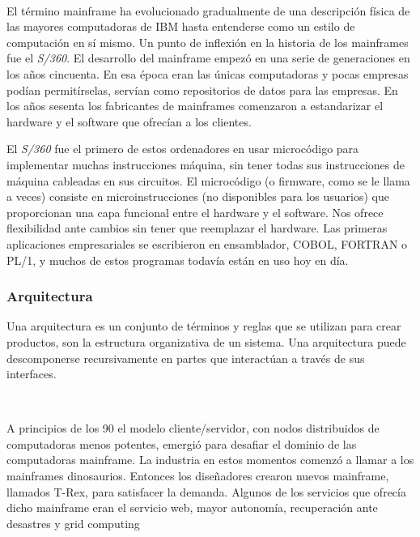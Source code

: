 \documentclass[paper=a4, fontsize=10pt]{scrartcl} %
\numberwithin{equation}{section} %
\numberwithin{figure}{section} %
\numberwithin{table}{section} %
\begin{document}
\

El término mainframe ha evolucionado gradualmente de una descripción física de las mayores computadoras de IBM hasta entenderse como un estilo de computación en sí mismo.
Un punto de inflexión en la historia de los mainframes fue el \textit{S/360}.
El desarrollo del mainframe empezó en una serie de generaciones en los años cincuenta.
En esa época eran las únicas computadoras y pocas empresas podían permitírselas, servían como repositorios de datos para las empresas.
En los años sesenta los fabricantes de mainframes comenzaron a estandarizar el hardware y el software que ofrecían a los clientes.


El \textit{S/360} fue el primero de estos ordenadores en usar microcódigo para implementar muchas instrucciones máquina, sin tener todas sus instrucciones de máquina cableadas en sus circuitos. 
El microcódigo (o firmware, como se le llama a veces) consiste en microinstrucciones (no disponibles para los usuarios) que proporcionan una capa funcional entre el hardware y el software.
Nos ofrece flexibilidad ante cambios sin tener que reemplazar el hardware.
Las primeras aplicaciones empresariales se escribieron en ensamblador, COBOL, FORTRAN o PL/1, y muchos de estos programas todavía están en uso hoy en día.

\subsubsection{Arquitectura}
Una arquitectura es un conjunto de términos y reglas que se utilizan para crear productos, son la estructura organizativa de un sistema.
Una arquitectura puede descomponerse recursivamente en partes que interactúan a través de sus interfaces.

\


A principios de los 90 el modelo cliente/servidor, con nodos distribuidos de computadoras menos potentes, emergió para desafiar el dominio de las computadoras mainframe.
La industria en estos momentos comenzó a llamar a los mainframes dinosaurios.
Entonces los diseñadores crearon nuevos mainframe, llamados T-Rex, para satisfacer la demanda.
Algunos de los servicios que ofrecía dicho mainframe eran el servicio web, mayor autonomía, recuperación ante desastres y grid computing
\end{document}
